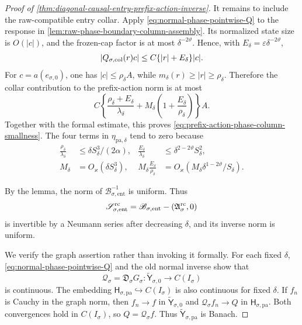 \begin{proof}[Proof of
\cref{thm:diagonal-causal-entry-prefix-action-inverse}]
It remains to include the raw-compatible entry collar.  Apply
\cref{eq:normal-phase-pointwise-Q} to the response in
\cref{lem:raw-phase-boundary-column-assembly}.  Its normalized state size
is \(O(|c|)\), and the frozen-cap factor is at most
\(\delta^{-2\vartheta}\).  Hence, with
\(E_\delta=\varepsilon\delta^{-2\vartheta}\),
\begin{equation}
 |Q_{\sigma,\rm col}(r)c|
 \le C\{|r|+E_\delta\}|c|.                      \label{eq:proof-prefix-action-collar-pointwise}
\end{equation}
For \(c=a(e_{\sigma,0})\), one has \(|c|\le\rho_\delta A\), while
\(m_\delta(r)\ge|r|\ge\rho_\delta\).  Therefore the collar contribution
to the prefix-action norm is at most
\begin{equation*}
 C\left\{
   \frac{\rho_\delta+E_\delta}{\lambda_\delta}
   +M_\delta\left(1+\frac{E_\delta}{\rho_\delta}\right)
   \right\}A.
\end{equation*}
Together with the formal estimate, this proves
\cref{eq:prefix-action-phase-column-smallness}.
The four terms in \(\eta_{\mathrm{pa},\delta}\) tend to zero because
\begin{align*}
 \frac{\rho_\delta}{\lambda_\delta}
 &\le\delta S_\delta^3/(2\alpha),&
 \frac{E_\delta}{\lambda_\delta}
 &\le\delta^{2-2\vartheta}S_\delta^2,\\
 M_\delta&=O_\varkappa(\delta S_\delta^3),&
 M_\delta\frac{E_\delta}{\rho_\delta}
 &=O_\varkappa(M_\delta\delta^{1-2\vartheta}/S_\delta).
\end{align*}

By the lemma, the norm of
\(\mathscr B_{\sigma,\mathrm{ent}}^{-1}\) is uniform.  Thus
\begin{equation}
 \mathscr S_{\sigma,\mathrm{ent}}^{\rm rc}
 =\mathscr B_{\sigma,\mathrm{ent}}
       -(\mathfrak A_\sigma^{\rm rc},0)          \label{eq:proof-causal-entry-phase-Schur}
\end{equation}
is invertible by a Neumann series after decreasing \(\delta\), and its
inverse norm is uniform.

We verify the graph assertion rather than invoking it formally.  For each
fixed \(\delta\), \cref{eq:normal-phase-pointwise-Q} and the old normal
inverse show that
\[
 \mathscr Q_\sigma=\mathfrak D_\sigma G_\sigma:
 \widetilde{\mathsf Y}_{\sigma,0}\longrightarrow C(I_\sigma)
\]
is continuous.  The embedding
\(\mathsf H_{\sigma,\mathrm{pa}}\hookrightarrow C(I_\sigma)\) is also
continuous for fixed \(\delta\).  If \(f_n\) is Cauchy in the graph norm,
then \(f_n\to f\) in \(\widetilde{\mathsf Y}_{\sigma,0}\) and
\(\mathscr Q_\sigma f_n\to Q\) in
\(\mathsf H_{\sigma,\mathrm{pa}}\).  Both convergences hold in \(C(I_\sigma)\),
so \(Q=\mathscr Q_\sigma f\).  Thus
\(\widetilde{\mathsf Y}_{\sigma,\mathrm{pa}}\) is Banach.


\end{proof}

